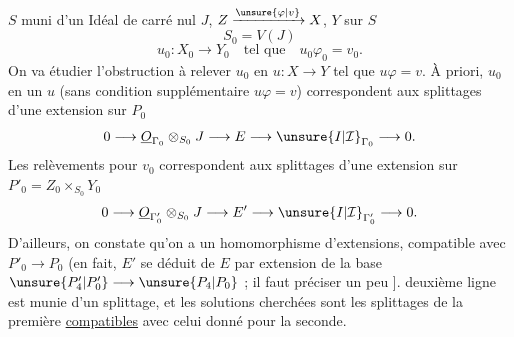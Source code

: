 $S$  muni d'un Idéal  de carré nul $J$,
$Z\xrightarrow{\unsure{\varphi|v}}X$, $Y$ sur $S$
\[
S_0=V(J)
\]
\[
u_0:X_0\longrightarrow Y_0\quad\text{tel que}\quad u_0\varphi_0=v_0.
\]
On va étudier l'obstruction à relever $u_0$ en $u:X\longrightarrow Y$
tel que $u\varphi=v$. 
À priori, 
$u_0$ en un $u$ (sans condition supplémentaire $u\varphi=v$)
correspondent aux splittages d'une extension sur $P_0$
\[
0\longrightarrow\underline{O}_{\Gamma_0}\otimes_{S_0}J\longrightarrow E\longrightarrow\unsure{I|\mathcal{I}}_{\Gamma_0}\longrightarrow0.
\]
Les relèvements pour $v_0$ correspondent aux splittages
d'une extension  sur $P'_0=Z_0\times_{S_0}Y_0$
\[
0\longrightarrow\underline{O}_{\Gamma'_0}\otimes_{S_0}J\longrightarrow E'\longrightarrow\unsure{I|\mathcal{I}}_{\Gamma'_0}\longrightarrow0.
\]
D'ailleurs, on constate qu'on a un homomorphisme
d'extensions, compatible avec $P'_0\longrightarrow P_0$
(en fait, $E'$ se déduit de $E$ par extension de
la base $\unsure{P'_4|P'_0}\longrightarrow\unsure{P_4|P_0}$  
;
\unsure{\}} il
faut préciser un peu ]. 
 deuxième ligne est
munie d'un splittage, et les solutions
cherchées sont les splittages de la première
\uline{compatibles} avec celui donné pour la seconde.
